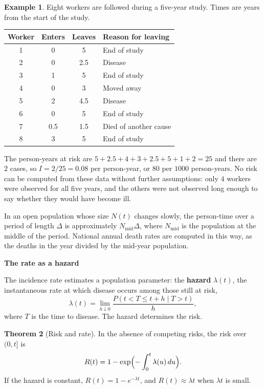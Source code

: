 \documentclass[11pt,a4paper]{article}
\numberwithin{equation}{section}
\theoremstyle{definition}
\newtheorem{thm}{Theorem}[subsection]
\newtheorem{exa}[thm]{Example}
\newcommand{\subhead}[1]{%
  \par\medskip\noindent\textbf{#1}\par\nobreak\smallskip}
\begin{document}
\begin{exa}
\label{exa:persontime}
Eight workers are followed during a five-year study. Times are years from the start of the study.
\begin{center}
\begin{tabular}{cccl}
\hline
Worker & Enters & Leaves & Reason for leaving \\
\hline
1 & 0 & 5 & End of study \\
2 & 0 & 2.5 & Disease \\
3 & 1 & 5 & End of study \\
4 & 0 & 3 & Moved away \\
5 & 2 & 4.5 & Disease \\
6 & 0 & 5 & End of study \\
7 & 0.5 & 1.5 & Died of another cause \\
8 & 3 & 5 & End of study \\
\hline
\end{tabular}
\end{center}
The person-years at risk are $5 + 2.5 + 4 + 3 + 2.5 + 5 + 1 + 2 = 25$ and there are $2$ cases, so $I = 2/25 = 0.08$ per person-year, or $80$ per
$1000$ person-years. No risk can be computed from these data without further assumptions: only $4$ workers were observed for all five
years, and the others were not observed long enough to say whether they would have become ill.
\end{exa}

In an open population whose size $N(t)$ changes slowly, the person-time over a period of length $\Delta$ is approximately $N_{\text{mid}}\Delta$,
where $N_{\text{mid}}$ is the population at the middle of the period. National annual death rates are computed in this way, as the deaths in the year divided by the mid-year population.

\subhead{The rate as a hazard}

The incidence rate estimates a population parameter: the \textbf{hazard} $\lambda(t)$, the instantaneous rate at which disease occurs among
those still at risk,
\[
\lambda(t) = \lim_{h \downarrow 0} \frac{P(t < T \leq t + h \mid T > t)}{h} ,
\]
where $T$ is the time to disease. The hazard determines the risk.

\begin{thm}[Risk and rate]
\label{thm:riskrate}
In the absence of competing risks, the risk over $(0, t]$ is
\[
R(t) = 1 - \exp\Bigl(-\int_0^t \lambda(u)\,du\Bigr) .
\]
If the hazard is constant, $R(t) = 1 - e^{-\lambda t}$, and $R(t) \approx \lambda t$ when $\lambda t$ is small.
\end{thm}
\end{document}
